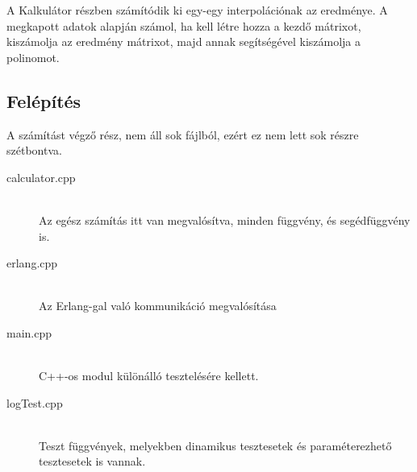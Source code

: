 A Kalkulátor részben számítódik ki egy-egy interpolációnak az eredménye.
A megkapott adatok alapján számol, ha kell létre hozza a kezdő mátrixot, kiszámolja az eredmény mátrixot, majd annak segítségével kiszámolja a polinomot. \newline

\subsection{Felépítés}
	A számítást végző rész, nem áll sok fájlból, ezért ez nem lett sok részre szétbontva. 
	\begin{description}
		\item[calculator.cpp] 
		\hfill \\ Az egész számítás itt van megvalósítva, minden függvény, és segédfüggvény is.
		\item[erlang.cpp] 
		\hfill \\ Az Erlang-gal való kommunikáció megvalósítása
		\item[main.cpp] 
		\hfill \\ C++-os modul különálló tesztelésére kellett.
		\item[logTest.cpp] 
		\hfill \\ 
		Teszt függvények, melyekben dinamikus tesztesetek és paraméterezhető tesztesetek is vannak.
	\end{description}
